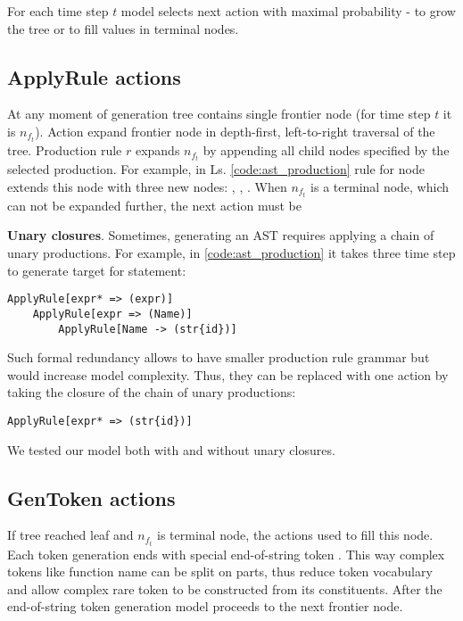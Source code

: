 For each time step $t$ model selects next action with maximal probability -  to grow the tree or  to fill values in terminal nodes. 

\subsection{ApplyRule actions}

At any moment of generation tree contains single frontier node (for time step $t$ it is $n_{f_t}$). Action  expand frontier node in depth-first, left-to-right traversal of the tree. Production rule $r$ expands $n_{f_t}$ by appending all child nodes specified by the selected production. For example, in Ls. \ref{code:ast_production} rule for node  extends this node with three new nodes: , , . 
When $n_{f_t}$ is a terminal node, which can not be expanded further, the next action must be 

\textbf{Unary closures}. Sometimes, generating an AST requires applying a chain of unary productions. For example, in \ref{code:ast_production} it takes three time step to generate target for  statement:
\begin{verbatim}
ApplyRule[expr* => (expr)]
    ApplyRule[expr => (Name)]
        ApplyRule[Name -> (str{id})]
\end{verbatim}
Such formal redundancy allows to have smaller production rule grammar but would increase model complexity. Thus, they can be replaced with one action by taking the closure of the chain of unary productions:
\begin{verbatim}
ApplyRule[expr* => (str{id})]
\end{verbatim}

We tested our model both with and without unary closures.

\subsection{GenToken actions}
If tree reached leaf and $n_{f_t}$ is terminal node, the  actions used to fill this node. Each token generation ends with special end-of-string token . This way complex tokens like function name  can be split on parts, thus reduce token vocabulary and allow complex rare token to be constructed from its constituents. After the end-of-string token generation model proceeds to the next frontier node.

